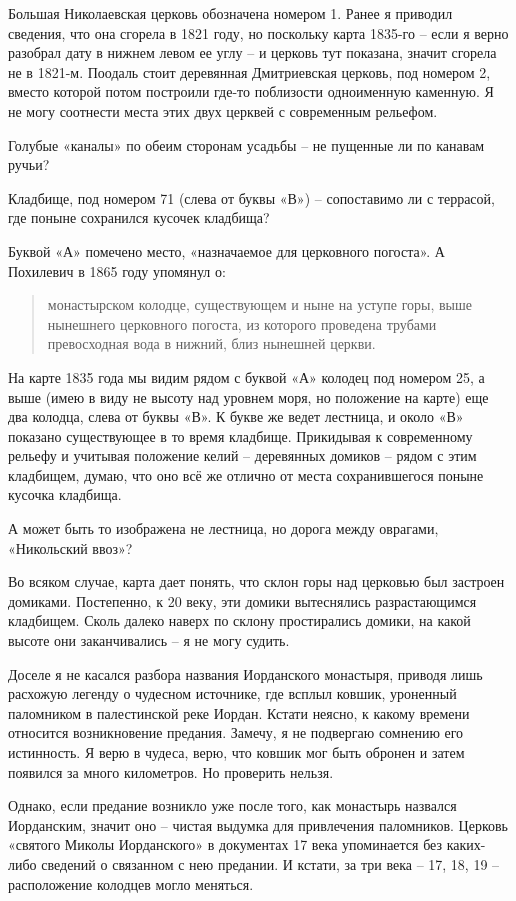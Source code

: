 Большая Николаевская церковь обозначена номером 1. Ранее я приводил сведения, что она сгорела в 1821 году, но поскольку карта 1835-го – если я верно разобрал дату в нижнем левом ее углу – и церковь тут показана, значит сгорела не в 1821-м. Поодаль стоит деревянная Дмитриевская церковь, под номером 2, вместо которой потом построили где-то поблизости одноименную каменную. Я не могу соотнести места этих двух церквей с современным рельефом.

Голубые «каналы» по обеим сторонам усадьбы – не пущенные ли по канавам ручьи?

Кладбище, под номером 71 (слева от буквы «В») – сопоставимо ли с террасой, где поныне сохранился кусочек кладбища?

Буквой «А» помечено место, «назначаемое для церковного погоста». А Похилевич в 1865 году упомянул о:

\begin{quotation}
монастырском колодце, существующем и ныне на уступе горы, выше нынешнего церковного погоста, из которого проведена трубами превосходная вода в нижний, близ нынешней церкви.
\end{quotation}

На карте 1835 года мы видим рядом с буквой «А» колодец под номером 25, а выше (имею в виду не высоту над уровнем моря, но положение на карте) еще два колодца, слева от буквы «В». К букве же ведет лестница, и около «В» показано существующее в то время кладбище. Прикидывая к современному рельефу и учитывая положение келий – деревянных домиков – рядом с этим кладбищем, думаю, что оно всё же отлично от места сохранившегося поныне кусочка кладбища.

А может быть то изображена не лестница, но дорога между оврагами, «Никольский ввоз»?

Во всяком случае, карта дает понять, что склон горы над церковью был застроен домиками. Постепенно, к 20 веку, эти домики вытеснялись разрастающимся кладбищем. Сколь далеко наверх по склону простирались домики, на какой высоте они заканчивались – я не могу судить.


Доселе я не касался разбора названия Иорданского монастыря, приводя лишь расхожую легенду о чудесном источнике, где всплыл ковшик, уроненный паломником в палестинской реке Иордан. Кстати неясно, к какому времени относится возникновение предания. Замечу, я не подвергаю сомнению его истинность. Я верю в чудеса, верю, что ковшик мог быть обронен и затем появился за много километров. Но проверить нельзя. 

Однако, если предание возникло уже после того, как монастырь назвался Иорданским, значит оно – чистая выдумка для привлечения паломников. Церковь «святого Миколы Иорданского» в документах 17 века упоминается без каких-либо сведений о связанном с нею предании. И кстати, за три века – 17, 18, 19 – расположение колодцев могло меняться.

